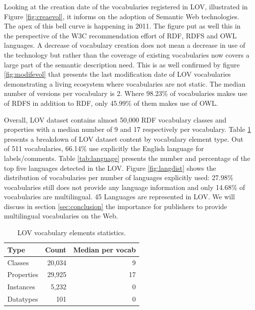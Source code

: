 \documentclass{iosart2c}
\begin{document}
Looking at the creation date of the vocabularies registered in LOV, illustrated in Figure \ref{fig:creaevol}, it informs on the adoption of Semantic Web technologies. The apex of this bell curve is happening in 2011. The figure put as well this in the perspective of the W3C recommendation effort of RDF, RDFS and OWL languages. A decrease of vocabulary creation does not mean a decrease in use of the technology but rather than the coverage of existing vocabularies now covers a large part of the semantic description need. This is as well confirmed by figure \ref{fig:modifevol} that presents the last modification date of LOV vocabularies demonstrating a living ecosystem where vocabularies are not static. The median number of versions per vocabulary is 2. Where 98.23\% of vocabularies makes use of RDFS in addition to RDF, only 45.99\% of them makes use of OWL. 

Overall, LOV dataset contains almost 50,000 RDF vocabulary classes and properties with a median number of 9 and 17 respectively per vocabulary. Table \ref{tab:elements} presents a breakdown of LOV dataset content by vocabulary element type. Out of 511 vocabularies, 66.14\% use explicitly the English language for labels/comments. Table \ref{tab:language} presents the number and percentage of the top five languages detected in the LOV. Figure \ref{fig:langdist} shows the distribution of vocabularies per number of languages explicitly used: 27.98\% vocabularies still does not provide any language information and only 14.68\% of vocabularies are multilingual. 45 Languages are represented in LOV. We will discuss in section \ref{sec:conclusion} the importance for publishers to provide multilingual vocabularies on the Web.

\begin{table}[h!tb]
\caption{LOV vocabulary elements statistics.}
\begin{tabular}{lrr}
\hline
\textbf{Type} & \textbf{Count} &  \textbf{Median per vocab} \\ \hline
Classes & 20,034 & 9 \\
Properties & 29,925 & 17 \\
Instances & 5,232 & 0 \\
Datatypes & 101 & 0 \\
\hline  
\end{tabular}
\label{tab:elements}
\end{table}
\end{document}
